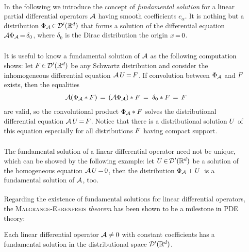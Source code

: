 \documentclass[11pt,twoside]{article}
\begin{document}
\paragraph{} %
In the following we introduce the concept of \textit{fundamental solution}
for a linear partial differential operators ${\mathcal{A}}$
having smooth coefficients $c_{\alpha}$.
It is nothing but a distribution $\Phi_{{\mathcal{A}}} {\,\in\,} {\mathcal{D}}'({\mathbb{R}}^d)$
that forms a solution of the differential equation
${\mathcal{A}} \Phi_{{\mathcal{A}}} {\,=\,} \delta_0$,
where $\delta_0$ is the Dirac distribution {\wrt} the origin $x {\,=\,} 0$.

\subparagraph{}
It is useful to know a fundamental solution of ${\mathcal{A}}$
as the following computation shows:
let $F {\,\in\,} {\mathcal{D}}'({\mathbb{R}}^d)$ be any Schwartz distribution and consider the
inhomogeneous differential equation ${\mathcal{A}} \, U {\,=\,} F$.
If convolution between $\Phi_{{\mathcal{A}}}$ and $F$ exists,
then the equalities
\[
{\mathcal{A}}(\Phi_{{\mathcal{A}}} \ast F)  \,=\,
({\mathcal{A}} \Phi_{{\mathcal{A}}}) \ast F \, = \;
\delta_0 \ast F         \,=\, F
\]
are valid,
so the convolutional product $\Phi_{{\mathcal{A}}} \ast F$
solves the distributional differential equation ${\mathcal{A}} \, U {\,=\,} F$. 
Notice that
there is a distributional solution $U$ of this equation
especially for all distributions $F$ having compact support.

\subparagraph{}
The fundamental solution of a linear differential operator
need not be unique,
which can be showed by the following example:
let $U {\,\in\,} {\mathcal{D}}'({\mathbb{R}}^d)$ be a solution of the homogeneous equation
${\mathcal{A}} \, U {\,=\,} 0$,
then the distribution $\Phi_{{\mathcal{A}}} + U\,$
is a fundamental solution of ${\mathcal{A}}$, too.

\paragraph{} %
Regarding the existence of fundamental solutions for linear 
differential operators,
the \textsc{Malgrange-Ehrenpreis} \textit{theorem}
has been shown to be a milestone in PDE theory:

\begin{theorem1}\label{MALGRANGE-EHRENPREIS_THEOREM}
Each linear differential operator ${\mathcal{A}} \neq 0$
with constant coefficients
has a fundamental solution in the distributional space ${\mathcal{D}}'({\mathbb{R}}^d)$.
\end{theorem1}
\end{document}
